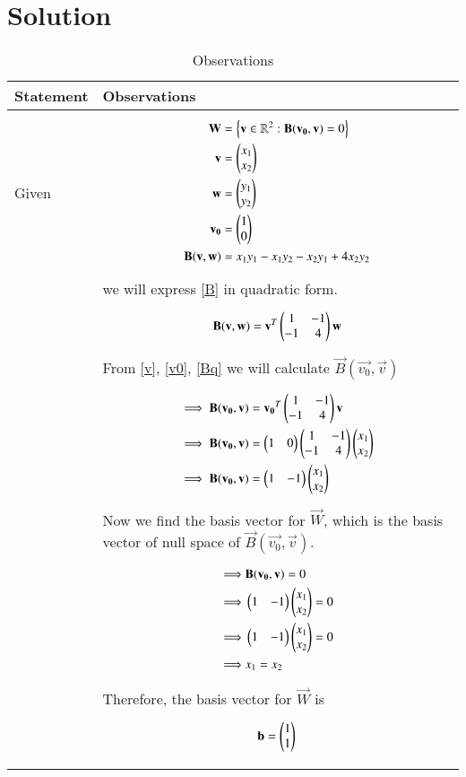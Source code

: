 \documentclass[journal,12pt]{IEEEtran}
\begin{document}
\section{\textbf{Solution}}
\renewcommand{\thetable}{2}
\begin{longtable}{|l|l|}
\hline
\endhead
\textbf{Statement}&\textbf{Observations}\\
\hline
Given&\parbox{15cm}{\begin{align}
    \mathbf{W}&=\left\{\mathbf{v}\in\mathbb{R}^2:\mathbf{B}(\mathbf{v_0},\mathbf{v})=0\right\}\label{W}\\
    \mathbf{v}&=\begin{pmatrix}x_1\\x_2\end{pmatrix}\label{v}\\
    \mathbf{w}&=\begin{pmatrix}y_1\\y_2\end{pmatrix}\label{w}\\
    \mathbf{v_0}&=\begin{pmatrix}1\\0\end{pmatrix}\label{v0}\\
    \mathbf{B}(\mathbf{v},\mathbf{w})&=x_1y_1-x_1y_2-x_2y_1+4x_2y_2\label{B}
\end{align}}\\&we will express \eqref{B} in quadratic form.\\&\parbox{15cm}{\begin{align}
    \mathbf{B}(\mathbf{v},\mathbf{w})=\mathbf{v}^T\begin{pmatrix}1&-1\\-1&4\end{pmatrix}\mathbf{w}\label{Bq}
\end{align}}\\&From \eqref{v}, \eqref{v0}, \eqref{Bq} we will calculate $\vec{B}(\vec{v_0},\vec{v})$\\&\parbox{15cm}{\begin{align}
    \implies\mathbf{B}(\mathbf{v_0},\mathbf{v})&=\mathbf{v_0}^T\begin{pmatrix}1&-1\\-1&4\end{pmatrix}\mathbf{v}\\
    \implies\mathbf{B}(\mathbf{v_0},\mathbf{v})&=\begin{pmatrix}1&0\end{pmatrix}\begin{pmatrix}1&-1\\-1&4\end{pmatrix}\begin{pmatrix}x_1\\x_2\end{pmatrix}\\
    \implies\mathbf{B}(\mathbf{v_0},\mathbf{v})&=\begin{pmatrix}1&-1\end{pmatrix}\begin{pmatrix}x_1\\x_2\end{pmatrix}\label{Bv0}
\end{align}}\\&Now we find the basis vector for $\vec{W}$, which is the basis vector of null space of $\vec{B}(\vec{v_0},\vec{v})$.\\&\parbox{15cm}{\begin{align}
    \implies&\mathbf{B}(\mathbf{v_0},\mathbf{v})=0\\
    \implies&\begin{pmatrix}1&-1\end{pmatrix}\begin{pmatrix}x_1\\x_2\end{pmatrix}=0\\
    \implies&\begin{pmatrix}1&-1\end{pmatrix}\begin{pmatrix}x_1\\x_2\end{pmatrix}=0\\
    \implies&x_1=x_2
\end{align}}\\&Therefore, the basis vector for $\vec{W}$ is\\&\parbox{15cm}{\begin{align}
    \mathbf{b}=\begin{pmatrix}1\\1\end{pmatrix}\label{basis}
\end{align}}\\
\hline
\caption{Observations}
\label{obs}
\end{longtable}
\end{document}
